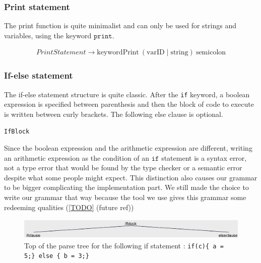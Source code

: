 \subsubsection*{Print statement}

The print function is quite minimalist and can only be used for strings and variables, using the keyword $\texttt{print}$.

\begin{align*}
    \mathit{PrintStatement} \rightarrow \text{keywordPrint} \: (\text{varID} \mid \text{string}) \: \text{semicolon}
\end{align*}

\subsubsection*{If-else statement}

The if-else statement structure is quite classic.
After the \texttt{if} keyword, a boolean expression is specified between parenthesis and then the block of code to execute is written between curly brackets.
The following else clause is optional.

\begin{lstlisting}[caption={test},captionpos=b, label={lst:teststuff}]
    IfBlock
\end{lstlisting}

Since the boolean expression and the arithmetic expression are different, writing an arithmetic expression as the condition of an $\texttt{if}$ statement is a syntax error, not a type error that would be found by the type checker or a semantic error despite what some people might expect.
This distinction also causes our grammar to be bigger complicating the implementation part.
We still made the choice to write our grammar that way because the tool we use gives this grammar some redeeming qualities (\ref{TODO} (future ref))

\begin{figure}[H]
    \centering
    \includegraphics[height = 1cm]{figures/parse_trees/parseTree_ifblock}
    \caption{Top of the parse tree for the following if statement : \texttt{if(c)\{
        a = 5;\}
        else \{
            b = 3;\}}}
    \label{fig:parseTree_ifblock}
\end{figure}

